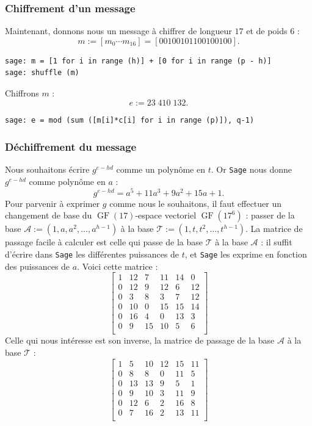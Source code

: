 \documentclass[a4paper, titlepage, 11pt]{article}
\theoremstyle{definition}
\theoremstyle{remark}
\def\gf{\operatorname{GF}}
\begin{document}
\subsubsection*{Chiffrement d'un message}
Maintenant, donnons nous un message à chiffrer de longueur $17$ et de poids $6$ :
$$m := [m_0\cdots m_{16}] = [00100101100100100].$$
\begin{verbatim}
sage: m = [1 for i in range (h)] + [0 for i in range (p - h)]
sage: shuffle (m)
\end{verbatim}
Chiffrons $m$ :
$$e := 23\;410\;132.$$
\begin{verbatim}
sage: e = mod (sum ([m[i]*c[i] for i in range (p)]), q-1)
\end{verbatim}

\subsubsection*{Déchiffrement du message}
Nous souhaitons écrire $g^{e - hd}$ comme un polynôme en $t$. Or \verb|Sage| nous donne $g^{e - hd}$ comme polynôme en $a$ : $$g^{e - hd} = a^5 + 11a^3 + 9a^2 + 15a + 1.$$
Pour parvenir à exprimer $g$ comme nous le souhaitons, il faut effectuer un changement de base du $\gf(17)$-espace vectoriel $\gf(17^6)$ : passer de la base $\mathcal{A} := (1, a, a^2, \dots, a^{h-1})$ à la base $\mathcal{T} := (1, t, t^2, \dots, t^{h-1})$.
La matrice de passage facile à calculer est celle qui passe de la base $\mathcal{T}$ à la base $\mathcal{A}$ : il suffit d'écrire dans \verb|Sage| les différentes puissances de $t$, et \verb|Sage| les exprime en fonction des puissances de $a$. Voici cette matrice :
$$\left[\begin{array}{cccccc}
1 & 12 & 7 & 11 & 14 & 0 \\
0 & 12 & 9 & 12 & 6 & 12 \\
0 & 3 & 8 & 3 & 7 & 12 \\
0 & 10 & 0 & 15 & 15 & 14 \\
0 & 16 & 4 & 0 & 13 & 3 \\
0 & 9 & 15 & 10 & 5 & 6 \\
\end{array}\right]$$
Celle qui nous intéresse est son inverse, la matrice de passage de la base $\mathcal{A}$ à la base $\mathcal{T}$ :
$$\left[\begin{array}{cccccc}
1 & 5 & 10 & 12 & 15 & 11 \\
0 & 8 & 8 & 0 & 11 & 5 \\
0 & 13 & 13 & 9 & 5 & 1 \\
0 & 9 & 10 & 3 & 11 & 9 \\
0 & 12 & 6 & 2 & 16 & 8 \\
0 & 7 & 16 & 2 & 13 & 11 \\
\end{array}\right]$$
\end{document}
